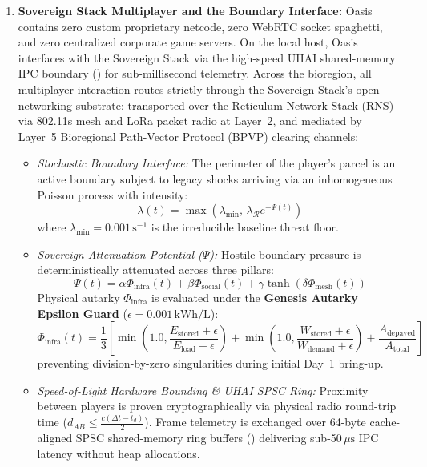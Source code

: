 \begin{enumerate}
    \item \textbf{Sovereign Stack Multiplayer and the Boundary Interface:} Oasis contains zero custom proprietary netcode, zero WebRTC socket spaghetti, and zero centralized corporate game servers. On the local host, Oasis interfaces with the Sovereign Stack via the high-speed UHAI shared-memory IPC boundary () for sub-millisecond telemetry. Across the bioregion, all multiplayer interaction routes strictly through the Sovereign Stack's open networking substrate: transported over the Reticulum Network Stack (RNS) via 802.11s mesh and LoRa packet radio at Layer~2, and mediated by Layer~5 Bioregional Path-Vector Protocol (BPVP) clearing channels:
    \begin{itemize}
        \item \textit{Stochastic Boundary Interface:} The perimeter of the player's parcel is an active boundary subject to legacy shocks arriving via an inhomogeneous Poisson process with intensity:
        \begin{equation}
            \lambda(t) = \max\left(\lambda_{\min}, \, \lambda_{\mathcal{R}} e^{-\Psi(t)}\right)
        \end{equation}
        where $\lambda_{\min} = 0.001\,\mathrm{s}^{-1}$ is the irreducible baseline threat floor.
        \item \textit{Sovereign Attenuation Potential ($\Psi$):} Hostile boundary pressure is deterministically attenuated across three pillars:
        \begin{equation}
            \Psi(t) = \alpha \Phi_{\mathrm{infra}}(t) + \beta \Phi_{\mathrm{social}}(t) + \gamma \tanh\left(\delta \Phi_{\mathrm{mesh}}(t)\right)
        \end{equation}
        Physical autarky $\Phi_{\mathrm{infra}}$ is evaluated under the \textbf{Genesis Autarky Epsilon Guard} ($\epsilon = 0.001\,\mathrm{kWh/L}$):
        \begin{equation}
            \Phi_{\mathrm{infra}}(t) = \frac{1}{3} \left[ \min\left(1.0, \frac{E_{\mathrm{stored}} + \epsilon}{E_{\mathrm{load}} + \epsilon}\right) + \min\left(1.0, \frac{W_{\mathrm{stored}} + \epsilon}{W_{\mathrm{demand}} + \epsilon}\right) + \frac{A_{\mathrm{depaved}}}{A_{\mathrm{total}}} \right]
        \end{equation}
        preventing division-by-zero singularities during initial Day~1 bring-up.
        \item \textit{Speed-of-Light Hardware Bounding \& UHAI SPSC Ring:} Proximity between players is proven cryptographically via physical radio round-trip time ($d_{AB} \le \frac{c(\Delta t - t_d)}{2}$). Frame telemetry is exchanged over 64-byte cache-aligned SPSC shared-memory ring buffers () delivering sub-50\,$\mu\mathrm{s}$ IPC latency without heap allocations.
    \end{itemize}
\end{enumerate}


